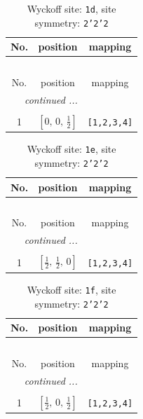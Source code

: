 \documentclass[fleqn,8pt]{jsarticle}
\begin{document}
\renewcommand{\arraystretch}{1.2}
\begin{longtable}{ccc}
\caption{Wyckoff site: {\tt 1d}, site symmetry: {\tt 2'2'2}}
 \\
 \hline \hline
No. & position & mapping \\ \hline \endfirsthead

\multicolumn{2}{l}{\tablename\ \thetable{}} \\
 \hline \hline
No. & position & mapping \\ \hline \endhead

 \hline \hline
\multicolumn{2}{r}{\footnotesize\it continued ...} \\ \endfoot

 \hline \hline
\multicolumn{2}{r}{} \\ \endlastfoot

1 & $\left[ 0,\, 0,\, \frac{1}{2} \right]$ & {\tt [1,2,3,4]} \\
\end{longtable}
\renewcommand{\arraystretch}{1.2}
\begin{longtable}{ccc}
\caption{Wyckoff site: {\tt 1e}, site symmetry: {\tt 2'2'2}}
 \\
 \hline \hline
No. & position & mapping \\ \hline \endfirsthead

\multicolumn{2}{l}{\tablename\ \thetable{}} \\
 \hline \hline
No. & position & mapping \\ \hline \endhead

 \hline \hline
\multicolumn{2}{r}{\footnotesize\it continued ...} \\ \endfoot

 \hline \hline
\multicolumn{2}{r}{} \\ \endlastfoot

1 & $\left[ \frac{1}{2},\, \frac{1}{2},\, 0 \right]$ & {\tt [1,2,3,4]} \\
\end{longtable}
\renewcommand{\arraystretch}{1.2}
\begin{longtable}{ccc}
\caption{Wyckoff site: {\tt 1f}, site symmetry: {\tt 2'2'2}}
 \\
 \hline \hline
No. & position & mapping \\ \hline \endfirsthead

\multicolumn{2}{l}{\tablename\ \thetable{}} \\
 \hline \hline
No. & position & mapping \\ \hline \endhead

 \hline \hline
\multicolumn{2}{r}{\footnotesize\it continued ...} \\ \endfoot

 \hline \hline
\multicolumn{2}{r}{} \\ \endlastfoot

1 & $\left[ \frac{1}{2},\, 0,\, \frac{1}{2} \right]$ & {\tt [1,2,3,4]} \\
\end{longtable}
\end{document}
